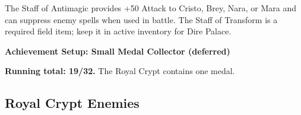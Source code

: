 \documentclass[
  american,
  10pt,
  letterpaper,
  oneside,
  open=any]{scrreprt}
\begin{document}
The Staff of Antimagic provides +50 Attack to Cristo, Brey, Nara, or
Mara and can suppress enemy spells when used in battle. The Staff of
Transform is a required field item; keep it in active inventory for Dire
Palace.

\begin{achievementsetup}

\textbf{Achievement Setup: Small Medal Collector (deferred)}

\textbf{Running total: 19/32.} The Royal Crypt contains one medal.

\end{achievementsetup}

\subsection{Royal Crypt Enemies}\label{royal-crypt-enemies}
\end{document}
